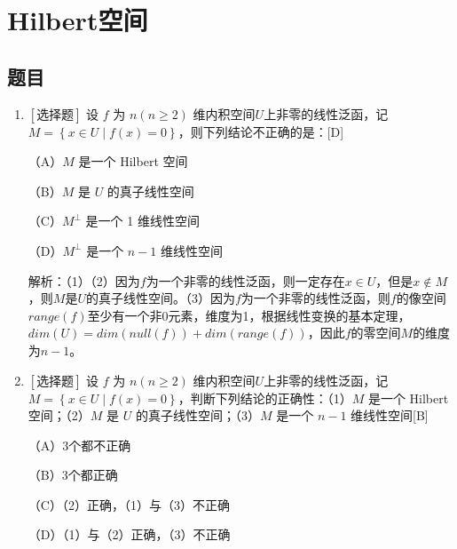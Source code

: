 \documentclass{article}
\begin{document}
\section{Hilbert空间}
\subsection{题目}
\begin{enumerate}
    \item $\left[\textbf{选择题}\right]$ 设 $f$ 为 $n(n \geq 2)$ 维内积空间$U$上非零的线性泛函，记$M=\left\{x\in U \mid f(x)=0\right\}$，则下列结论不正确的是：\hfill [D]    
        \begin{minipage}[t]{0.45\linewidth}
        （A）$M$ 是一个 Hilbert 空间
        \end{minipage}
        \hfill
        \begin{minipage}[t]{0.45\linewidth}
        （B）$M$ 是 $U$ 的真子线性空间
        \end{minipage}
        \begin{minipage}[t]{0.45\linewidth}
        （C）$M^{\perp}$ 是一个 1 维线性空间
        \end{minipage}
        \hfill
        \begin{minipage}[t]{0.45\linewidth}
        （D）$M^{\perp}$ 是一个 $n-1$ 维线性空间
        \end{minipage}

    解析：（1）（2）因为$f$为一个非零的线性泛函，则一定存在$x \in U$，但是$x \notin M$，则$M$是$U$的真子线性空间。（3）因为$f$为一个非零的线性泛函，则$f$的像空间$range(f)$至少有一个非$0$元素，维度为1，根据线性变换的基本定理，$dim(U) = dim(null(f)) + dim(range(f))$，因此$f$的零空间$M$的维度为$n-1$。

    \item $\left[\textbf{选择题}\right]$ 设 $f$ 为 $n(n \geq 2)$ 维内积空间$U$上非零的线性泛函，记$M=\left\{x\in U \mid f(x)=0\right\}$，判断下列结论的正确性：（1）$M$ 是一个 Hilbert 空间；（2）$M$ 是 $U$ 的真子线性空间；（3）$M$ 是一个 $n-1$ 维线性空间\hfill [B]
    
        \begin{minipage}[t]{0.45\linewidth}
        （A）3个都不正确
        \end{minipage}
        \hfill
        \begin{minipage}[t]{0.45\linewidth}
        （B）3个都正确
        \end{minipage}
        \begin{minipage}[t]{0.45\linewidth}
        （C）（2）正确，（1）与（3）不正确
        \end{minipage}
        \hfill
        \begin{minipage}[t]{0.45\linewidth}
        （D）（1）与（2）正确，（3）不正确
        \end{minipage}



\end{enumerate}
\end{document}
